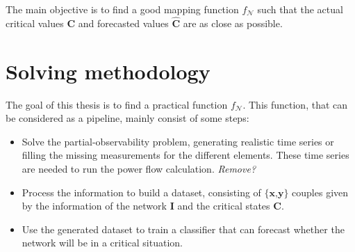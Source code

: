     
    
    

The main objective is to find a good mapping function $f_\mathcal{N}$ such that the actual critical values $\textbf{C}$ and forecasted values $\hat{\textbf{C}}$ are as close as possible.

\section{Solving methodology}
\label{sec:sm}
The goal of this thesis is to find a practical function $f_\mathcal{N}$. This function, that can be considered as a pipeline, mainly consist of some steps:
\begin{itemize}
    \item Solve the partial-observability problem, generating realistic time series or filling the missing measurements for the different elements. These time series are needed to run the power flow calculation. \emph{Remove?}
    \item Process the information to build a dataset, consisting of $\{\textbf{x,y}\}$ couples given by the information of the network $\textbf{I}$ and the critical states $\textbf{C}$.
    \item Use the generated dataset to train a classifier that can forecast whether the network will be in a critical situation.
\end{itemize}

